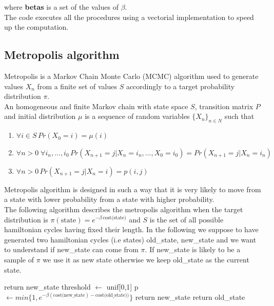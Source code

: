 \documentclass{article}
\begin{document}
\noindent where \textbf{betas} is a set of the values of $\beta$. \\ 
The code executes all the procedures using a vectorial implementation to speed up the computation.

\subsection{Metropolis algorithm}
Metropolis is a Markov Chain Monte Carlo (MCMC) algorithm used to generate values $X_n$ from a finite set of values $S$ accordingly to a target probability distribution $\pi$.  \\
An homogeneous and finite Markov chain with state space $S$, transition matrix $P$ and initial distribution $\mu$ is a sequence of random variables $\{ X_n \}_{n \in N}$ such that
\begin{enumerate}
\item $\forall i \in S \, Pr(X_0=i)= \mu(i)$ 
\item $\forall n > 0 \; \forall i_n,...,i_0 \,  Pr(X_{n+1} = j | X_n = i_n,..., X_0=i_0) = Pr(X_{n+1} = j | X_n = i_n)$
\item $\forall n > 0 \, Pr(X_{n+1} = j | X_n = i) = p(i,j) $
\end{enumerate}
Metropolis algorithm is designed in such a way that it is very likely to move from a state with lower probability from a state with higher probability. \\
The following algorithm describes the metropolis algorithm when the target distribution is $\pi(\text{state}) = e^{- \beta \, \text{cost(state)}}$ and $S$ is the set of all possible hamiltonian cycles having fixed their length. In the following we suppose to have generated two hamiltonian cycles (i.e states) old\_state, new\_state and we want to understand if new\_state can come from $\pi$. If new\_state is likely to be a sample of $\pi$ we use it as new state otherwise we keep old\_state as the current state.

\begin{algorithm}[H]
    \begin{algorithmic}[1]
      	\State return new\_state
      	\EndIf
        \State threshold $\leftarrow$ unif[0,1]
        \State p  $\leftarrow min\{1,e^{- \beta (\text{cost(new\_state}) - \text{cost(old\_state}))} \}$ 
        	\State return new\_state
        \Else
        	\State return old\_state
        \EndIf
       \EndFunction
\end{algorithmic}
\end{algorithm}
\noindent
\end{document}
